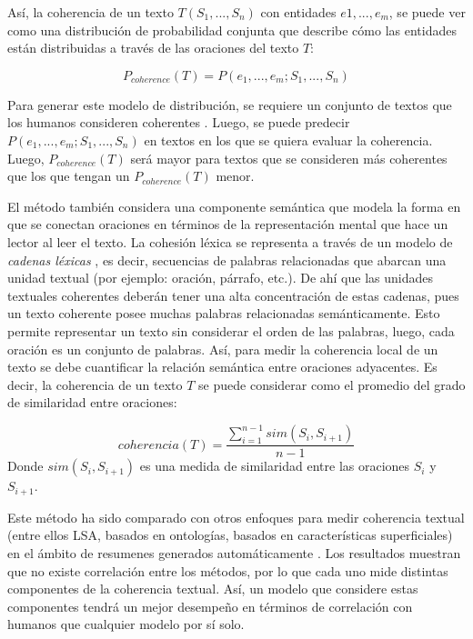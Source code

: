 \documentclass[12pt]{diicc}
\begin{document}
Así, la coherencia de un texto $T(S_1, ..., S_n)$ con entidades $e1, ..., e_m$, se puede ver como una distribución de probabilidad conjunta que describe cómo las entidades están distribuidas a través de las oraciones del texto $T$:

\begin{equation}
	P_{coherence}(T) = P(e_1,...,e_m; S_1,...,S_n)
\end{equation}

Para generar este modelo de distribución, se requiere un conjunto de textos que los humanos consideren coherentes \cite{t36}. Luego, se puede predecir $P(e_1,...,e_m; S_1,...,S_n)$ en textos en los que se quiera evaluar la coherencia. Luego, $P_{coherence}(T)$ será mayor para textos que se consideren más coherentes que los que tengan un $P_{coherence}(T)$ menor.

El método también considera una componente semántica que modela la forma en que se conectan oraciones en términos de la representación mental que hace un lector al leer el texto. La cohesión léxica se representa a través de un modelo de {\em cadenas léxicas} \cite{t39}, es decir, secuencias de palabras relacionadas que abarcan una unidad textual (por ejemplo: oración, párrafo, etc.). De ahí que las unidades textuales coherentes deberán tener una alta concentración de estas cadenas, pues un texto coherente posee muchas palabras relacionadas semánticamente. Esto permite representar un texto sin considerar el orden de las palabras, luego, cada oración es un conjunto de palabras. Así, para medir la coherencia local de un texto se debe cuantificar la relación semántica entre oraciones adyacentes. Es decir, la coherencia de un texto $T$ se puede considerar como el promedio del grado de similaridad entre oraciones:

\begin{equation}
	coherencia(T) = \frac{\sum_{i=1}^{n-1}sim(S_i, S_{i+1})}{n-1}
	\label{eq5}
\end{equation}
Donde $sim(S_i, S_{i+1})$ es una medida de similaridad entre las oraciones $S_i$ y $S_{i+1}$.

Este método ha sido comparado con otros enfoques para medir coherencia textual (entre ellos LSA, basados en ontologías, basados en características superficiales) en el ámbito de resumenes generados automáticamente \cite{t33}. Los resultados muestran que no existe correlación entre los métodos, por lo que cada uno mide distintas componentes de la coherencia textual. Así, un modelo que considere estas componentes tendrá un mejor desempeño en términos de correlación con humanos que cualquier modelo por sí solo.
\end{document}
